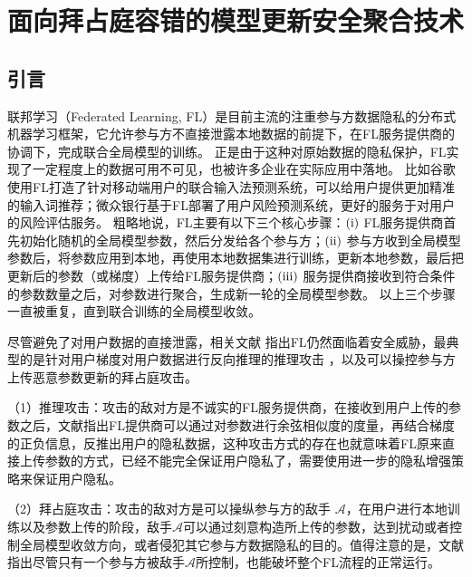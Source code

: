 \chapter{面向拜占庭容错的模型更新安全聚合技术}

\section{引言}
联邦学习（Federated Learning, FL）是目前主流的注重参与方数据隐私的分布式机器学习框架\cite{kairouz2019advances}，它允许参与方不直接泄露本地数据的前提下，在FL服务提供商的协调下，完成联合全局模型的训练。
正是由于这种对原始数据的隐私保护，FL实现了一定程度上的数据可用不可见，也被许多企业在实际应用中落地。
比如谷歌使用FL打造了针对移动端用户的联合输入法预测系统\cite{hard2018federated}，可以给用户提供更加精准的输入词推荐；微众银行基于FL部署了用户风险预测系统，更好的服务于对用户的风险评估服务。
粗略地说，FL主要有以下三个核心步骤：$(\rm \romannumeral1)$ FL服务提供商首先初始化随机的全局模型参数，然后分发给各个参与方；$(\rm \romannumeral2)$ 参与方收到全局模型参数后，将参数应用到本地，再使用本地数据集进行训练，更新本地参数，最后把更新后的参数（或梯度）上传给FL服务提供商；$(\rm \romannumeral3)$ 服务提供商接收到符合条件的参数数量之后，对参数进行聚合，生成新一轮的全局模型参数。
以上三个步骤一直被重复，直到联合训练的全局模型收敛。

尽管避免了对用户数据的直接泄露，相关文献\cite{kairouz2019advances, mothukuri2021survey, geiping2020inverting} 指出FL仍然面临着安全威胁，最典型的是针对用户梯度对用户数据进行反向推理的推理攻击 \cite{geiping2020inverting}，以及可以操控参与方上传恶意参数更新的拜占庭攻击\cite{kairouz2019advances, mothukuri2021survey}。

（1）推理攻击：攻击的敌对方是不诚实的FL服务提供商，在接收到用户上传的参数之后，文献\cite{geiping2020inverting}指出FL提供商可以通过对参数进行余弦相似度的度量，再结合梯度的正负信息，反推出用户的隐私数据，这种攻击方式的存在也就意味着FL原来直接上传参数的方式，已经不能完全保证用户隐私了，需要使用进一步的隐私增强策略来保证用户隐私。%

（2）拜占庭攻击：攻击的敌对方是可以操纵参与方的敌手 $\mathcal{A}$，在用户进行本地训练以及参数上传的阶段，敌手$\mathcal{A}$可以通过刻意构造所上传的参数，达到扰动或者控制全局模型收敛方向，或者侵犯其它参与方数据隐私的目的\cite{kairouz2019advances}。值得注意的是，文献\cite{blanchard2017machine}指出尽管只有一个参与方被敌手$\mathcal{A}$所控制，也能破坏整个FL流程的正常运行。

